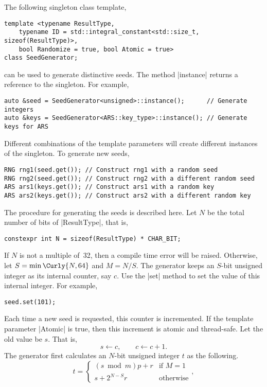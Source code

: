 The following singleton class template,
\begin{verbatim}
template <typename ResultType,
    typename ID = std::integral_constant<std::size_t, sizeof(ResultType)>,
    bool Randomize = true, bool Atomic = true>
class SeedGenerator;
\end{verbatim}
can be used to generate distinctive seeds. The method |instance| returns a
reference to the singleton. For example,
\begin{verbatim}
auto &seed = SeedGenerator<unsigned>::instance();      // Generate integers
auto &keys = SeedGenerator<ARS::key_type>::instance(); // Generate keys for ARS
\end{verbatim}
Different combinations of the template parameters will create different
instances of the singleton. To generate new seeds,
\begin{verbatim}
RNG rng1(seed.get()); // Construct rng1 with a random seed
RNG rng2(seed.get()); // Construct rng2 with a different random seed
ARS ars1(keys.get()); // Construct ars1 with a random key
ARS ars2(keys.get()); // Construct ars2 with a different random key
\end{verbatim}
The procedure for generating the seeds is described here. Let $N$ be the total
number of bits of |ResultType|, that is,
\begin{verbatim}
constexpr int N = sizeof(ResultType) * CHAR_BIT;
\end{verbatim}
If $N$ is not a multiple of~32, then a compile time error will be raised.
Otherwise, let $S = \min\Curly{N,64}$ and $M = N / S$. The generator keeps an
$S$-bit unsigned integer as its internal counter, say $c$. Use the |set| method
to set the value of this internal integer. For example,
\begin{verbatim}
seed.set(101);
\end{verbatim}
Each time a new seed is requested, this counter is incremented. If the template
parameter |Atomic| is true, then this increment is atomic and thread-safe. Let
the old value be $s$. That is,
\begin{equation*}
  s \leftarrow c,\qquad c \leftarrow c + 1.
\end{equation*}
The generator first calculates an $N$-bit unsigned integer $t$ as the
following.
\begin{equation*}
  t = \begin{cases}
    (s \bmod m) p + r &\text{if } M = 1 \\
    s + 2^{N - S}r    &\text{otherwise}
  \end{cases},
\end{equation*}
